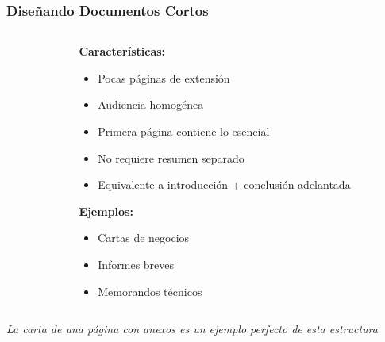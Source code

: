 \documentclass{beamer}
\begin{document}
\begin{frame}
\frametitle{Diseñando Documentos Cortos}

\begin{columns}
\begin{column}{0.48\textwidth}
\end{column}

\begin{column}{0.48\textwidth}
\textbf{Características:}
\begin{itemize}
    \item Pocas páginas de extensión
    \item Audiencia homogénea
    \item Primera página contiene lo esencial
    \item No requiere resumen separado
    \item Equivalente a introducción + conclusión adelantada
\end{itemize}

\vspace{0.3cm}
\textbf{Ejemplos:}
\begin{itemize}
    \item Cartas de negocios
    \item Informes breves
    \item Memorandos técnicos
\end{itemize}
\end{column}
\end{columns}

\vspace{0.3cm}
\textit{La carta de una página con anexos es un ejemplo perfecto de esta estructura}
\end{frame}
\end{document}
